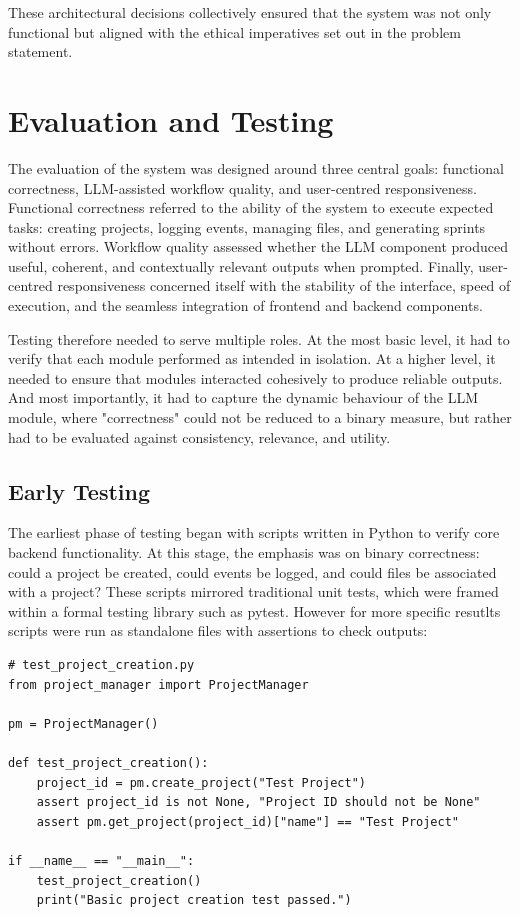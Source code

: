 \documentclass{report}
\begin{document}
These architectural decisions collectively ensured that the system was not only functional but aligned with the ethical imperatives set out in the problem statement.

\chapter{Evaluation and Testing}  
The evaluation of the system was designed around three central goals: functional correctness, LLM-assisted workflow quality, and user-centred responsiveness.
Functional correctness referred to the ability of the system to execute expected tasks: creating projects, logging events, managing files, and generating sprints without errors. 
Workflow quality assessed whether the LLM component produced useful, coherent, and contextually relevant outputs when prompted. 
Finally, user-centred responsiveness concerned itself with the stability of the interface, speed of execution, and the seamless integration of frontend and backend components.

Testing therefore needed to serve multiple roles. At the most basic level, it had to verify that each module performed as intended in isolation. 
At a higher level, it needed to ensure that modules interacted cohesively to produce reliable outputs. 
And most importantly, it had to capture the dynamic behaviour of the LLM module, where "correctness" could not be reduced to a binary measure, but rather had to be evaluated against consistency, relevance, and utility.

\section{Early Testing}

The earliest phase of testing began with scripts written in Python to verify core backend functionality. 
At this stage, the emphasis was on binary correctness: could a project be created, could events be logged, and could files be associated with a project? 
These scripts mirrored traditional unit tests, which were framed within a formal testing library such as pytest. 
However for more specific resutlts scripts were run as standalone files with assertions to check outputs:


\begin{lstlisting}[style=pythonstyle]
    # test_project_creation.py
from project_manager import ProjectManager

pm = ProjectManager()

def test_project_creation():
    project_id = pm.create_project("Test Project")
    assert project_id is not None, "Project ID should not be None"
    assert pm.get_project(project_id)["name"] == "Test Project"

if __name__ == "__main__":
    test_project_creation()
    print("Basic project creation test passed.")
\end{lstlisting}
\end{document}
